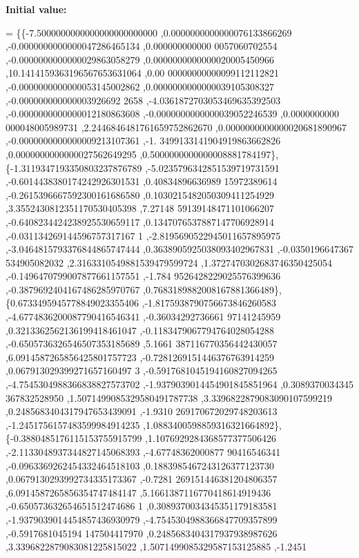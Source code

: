 {\bfseries Initial value\+:}
\begin{DoxyCode}
= \{\{-7.5000000000000000000000000 ,0.0000000000000076133866269 ,-0.0000000000000047286465134 ,0.000000000000
      0057060702554 ,-0.0000000000000029863058279 ,0.0000000000000020005450966 ,10.1414159363196567653631064 ,0.00
      00000000000099112112821 ,-0.0000000000000053145002862 ,0.0000000000000039105308327 ,-0.000000000000003926692
      2658 ,-4.0361872703053469635392503 ,-0.0000000000000012180863608 ,-0.0000000000000039052246539 ,0.0000000000
      000048005989731 ,2.2446846481761659752862670 ,0.0000000000000020681890967 ,-0.0000000000000009213107361 ,-1.
      3499133141904919863662826 ,0.0000000000000027562649295 ,0.5000000000000008881784197\},
\{-1.3119347193350803237876789 ,-5.0235796342851539719731591 ,-0.6014438380174242926301531 ,0.40834896636989
      15972389614 ,-0.2615396667592300161686580 ,0.1030215482050309411254929 ,3.3552430812351170530405398 ,7.27148
      59139148471101066207 ,-0.6408234424238925530659117 ,0.1347076537887147706928914 ,-0.031134269144596757317167
      1 ,-2.8195690522945011657895975 ,-3.0464815793376844865747444 ,0.3638905925038093402967831 ,-0.0350196647367
      534905082032 ,2.3163310549881539479599724 ,1.3727470302683746350425054 ,-0.1496470799007877661157551 ,-1.784
      9526428229025576399636 ,-0.3879692404167486285970767 ,0.7683189882008167881366489\},
\{0.6733495945778849023355406 ,-1.8175938790756673846260583 ,-4.6774836200087790416546341 ,-0.36034292736661
      97141245959 ,0.3213362562136199418461047 ,-0.1183479067794764028054288 ,-0.6505736326546507353185689 ,5.1661
      387116770356442430057 ,6.0914587265856425801757723 ,-0.7281269151446376763914259 ,0.067913029399271657160497
      3 ,-0.5917681045194160827094265 ,-4.7545304988366838827573702 ,-1.9379039014454901845851964 ,0.3089370034345
      367832528950 ,1.5071499085329580491787738 ,3.3396822879083090107599219 ,0.2485683404317947653439091 ,-1.9310
      269170672029748203613 ,-1.2451756157483599984914235 ,1.0883400598859316321664892\},
\{-0.3880485176115153755915799 ,1.1076929284368577377506426 ,-2.1133048937344827145068393 ,-4.67748362000877
      90416546341 ,-0.0963369262454332464518103 ,0.1883985467243126377123730 ,0.0679130293992734335173367 ,-0.7281
      269151446381204806357 ,6.0914587265856354747484147 ,5.1661387116770418614919436 ,-0.650573632654651512474686
      1 ,0.3089370034345351179183581 ,-1.9379039014454857436930979 ,-4.7545304988366847709357899 ,-0.5917681045194
      147504417970 ,0.2485683404317937938987626 ,3.3396822879083081225815022 ,1.5071499085329587153125885 ,-1.2451

\end{DoxyCode}
